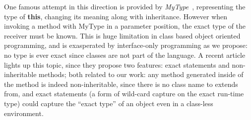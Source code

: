 One famous attempt in this direction is provided by
\emph{MyType}~\cite{bruce1994paradigmatic}, representing the type of
\textbf{this}, changing its meaning along with inheritance. However when
invoking a method with MyType in a parameter position, the exact type of the
receiver must be known.  This is huge limitation in class based object oriented
programming, and is exasperated by interface-only programming as we propose: no
type is ever exact since classes are not part of the language. A recent
article~\cite{Saito2013933} lights up this topic, since they propose two
features: exact statements  and non-inheritable methods; both
related to our work: any method generated inside of the \Q@of@ method is indeed
non-inheritable, since there is no class name to extends from, and exact
statements (a form of wild-card capture on the exact run-time type) could
capture the ``exact type'' of an object even in a class-less environment.






